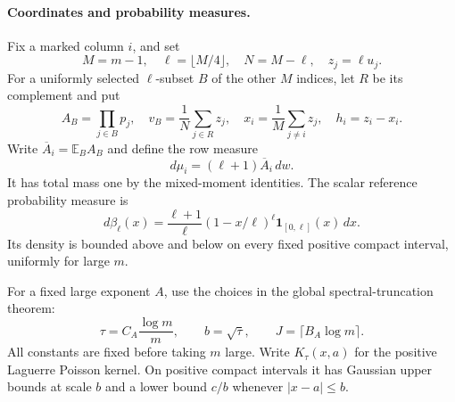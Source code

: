 \documentclass[11pt]{article}
\newcommand{\E}{\mathbb E}
\begin{document}
\paragraph{Coordinates and probability measures.}
Fix a marked column $i$, and set
\[
 M=m-1,\quad \ell=\lfloor M/4\rfloor,\quad N=M-\ell,
 \quad z_j=\ell u_j.
\]
For a uniformly selected $\ell$-subset $B$ of the other $M$ indices,
let $R$ be its complement and put
\[
 A_B=\prod_{j\in B}p_j,\quad
 v_B=\frac1N\sum_{j\in R}z_j,\quad
 x_i=\frac1M\sum_{j\ne i}z_j,\quad h_i=z_i-x_i.
\]
Write $\overline A_i=\E_BA_B$ and define the row measure
\[
 d\mu_i=(\ell+1)\overline A_i\,dw.
\]
It has total mass one by the mixed-moment identities.
The scalar reference probability measure is
\[
 d\beta_\ell(x)=\frac{\ell+1}{\ell}
 (1-x/\ell)^\ell\boldsymbol1_{[0,\ell]}(x)\,dx.
\]
Its density is bounded above and below on every fixed positive
compact interval, uniformly for large $m$.

For a fixed large exponent $A$, use the choices in the global
spectral-truncation theorem:
\[
 \tau=C_A\frac{\log m}{m},\qquad b=\sqrt\tau,
 \qquad J=\lceil B_A\log m\rceil.
\]
All constants are fixed before taking $m$ large. Write $K_\tau(x,a)$
for the positive Laguerre Poisson kernel. On positive compact
intervals it has Gaussian upper bounds at scale $b$ and a lower
bound $c/b$ whenever $|x-a|\le b$.
\end{document}
